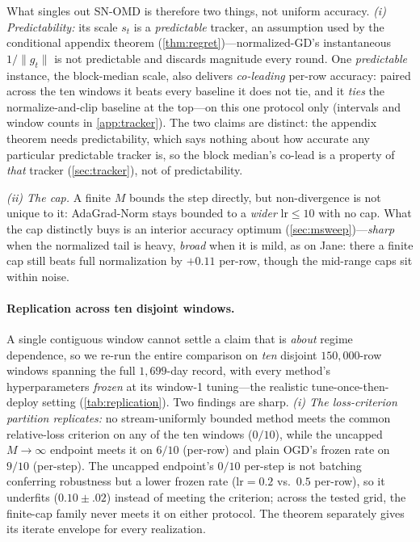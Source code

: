 \documentclass{article}
\newcommand{\norm}[1]{\lVert #1 \rVert}
\newcommand{\gt}{g_t}
\begin{document}
What singles out SN-OMD is therefore two things, not uniform accuracy. \emph{(i) Predictability:} its scale $s_t$ is a
\emph{predictable} tracker, an assumption used by the conditional appendix theorem
(\cref{thm:regret})---normalized-GD's instantaneous $1/\norm{\gt}$ is not predictable and discards
magnitude every round. One \emph{predictable} instance, the block-median scale, also delivers
\emph{co-leading} per-row accuracy: paired across the ten windows it beats every baseline it
does not tie, and it \emph{ties} the normalize-and-clip baseline at the top---on this one
protocol only (intervals and window counts in \cref{app:tracker}). The two claims are
distinct: the appendix theorem needs predictability, which says nothing about how accurate any
particular predictable tracker is, so the block median's co-lead is a property of \emph{that}
tracker (\cref{sec:tracker}), not of predictability.

\emph{(ii) The cap.} A finite $M$ bounds the step directly, but non-divergence is not unique
to it: AdaGrad-Norm stays bounded to a \emph{wider} $\mathrm{lr}\le10$ with no cap. What the cap
distinctly buys is an interior accuracy optimum (\cref{sec:msweep})---\emph{sharp} when the
normalized tail is heavy, \emph{broad} when it is mild, as on Jane: there a finite cap still
beats full normalization by ${+}0.11$ per-row, though the mid-range caps sit within noise.

\paragraph{Replication across ten disjoint windows.} A single contiguous window cannot
settle a claim that is \emph{about} regime dependence, so we re-run the entire comparison on
\emph{ten} disjoint $150{,}000$-row windows spanning the full $1{,}699$-day record, with every
method's hyperparameters \emph{frozen} at its window-1 tuning---the realistic
tune-once-then-deploy setting (\cref{tab:replication}). Two findings are sharp. \emph{(i) The
loss-criterion partition replicates:} no stream-uniformly bounded method meets the
common relative-loss criterion on any of the ten windows ($0/10$), while the uncapped
$M\!\to\!\infty$ endpoint meets it on $6/10$ (per-row) and plain OGD's frozen rate on $9/10$
(per-step). The
uncapped endpoint's $0/10$ per-step is not batching conferring robustness but a lower frozen
rate ($\mathrm{lr}{=}0.2$ vs.\ $0.5$ per-row), so it underfits ($0.10\!\pm\!.02$) instead of
meeting the criterion; across the tested grid, the finite-cap family never meets it on either
protocol. The theorem separately gives its iterate envelope for every realization.
\end{document}
